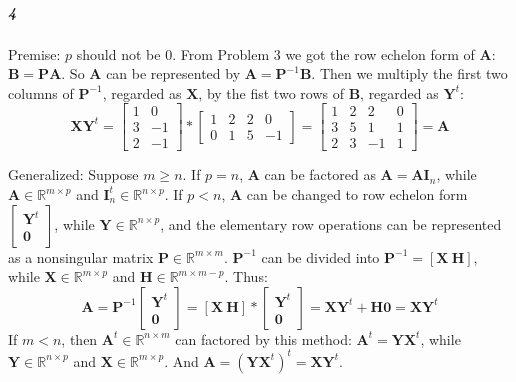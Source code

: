 \documentclass[22pt]{article}
\begin{document}
   	\subparagraph{4} Premise: $p$ should not be 0.
   	From Problem 3 we got the row echelon form of $\mathbf{A}$: $\mathbf{B} = \mathbf{PA}$. So $\mathbf{A}$ can be represented by $\mathbf{A} = \mathbf{P}^{-1}\mathbf{B}$. Then we multiply the first two columns of $\mathbf{P}^{-1}$, regarded as $\mathbf{X}$, by the fist two rows of $\mathbf{B}$, regarded as $\mathbf{Y}^t$:
   	\begin{equation}
   		\mathbf{XY}^t = \left[ \begin{array}{cc} 1 & 0\\3 &-1\\2 & -1
   		\end{array}\right] * \left[ \begin{array}{cccc} 1 & 2 &2 &0\\0 & 1 &5&-1
   		\end{array}\right] = \left[ \begin{array}{cccc} 1 & 2 &2 &0\\3 & 5 &1&1\\2&3&-1&1 
   		\end{array}\right] = \mathbf{A}
   	\end{equation}

   	Generalized: Suppose $m\geq n$. If $p = n$, $\mathbf{A}$ can be factored as $\mathbf{A} = \mathbf{AI}_n$, while $\mathbf{A} \in \mathbb{R}^{m\times p}$ and $\mathbf{I}^t_n \in \mathbb{R}^{n\times p}$. If $p < n$, $\mathbf{A}$ can be changed to row echelon form $\left[ \begin{array}{c} \mathbf{Y}^t\\ \mathbf{0}
   		\end{array} \right]$, while $ \mathbf{Y} \in \mathbb{R}^{n\times p}$, and the elementary row operations can be represented as a nonsingular matrix $\mathbf{P} \in \mathbb{R}^{m\times m}$. $\mathbf{P}^{-1}$ can be divided into $\mathbf{P}^{-1} = [\mathbf{X}\ \mathbf{H}]$, while $ \mathbf{X} \in \mathbb{R}^{m\times p}$ and $ \mathbf{H} \in\mathbb{R}^{m\times m-p}$. Thus:
   		\begin{equation}
   			\mathbf{A} = \mathbf{P}^{-1}\left[ \begin{array}{c} \mathbf{Y}^t\\ \mathbf{0}
   		\end{array} \right] = [\mathbf{X}\ \mathbf{H}]*\left[ \begin{array}{c} \mathbf{Y}^t\\ \mathbf{0}
   		\end{array} \right] = \mathbf{XY}^t + \mathbf{H0}= \mathbf{XY}^t
   		\end{equation}
   		If $m<n$, then $\mathbf{A}^t \in \mathbb{R}^{n\times m}$ can factored by this method: $\mathbf{A}^t = \mathbf{YX}^t$, while $\mathbf{Y} \in \mathbb{R}^{n\times p}$ and $\mathbf{X} \in \mathbb{R}^{m\times p}$. And $\mathbf{A} = (\mathbf{YX}^t)^t = \mathbf{XY}^t$.
\end{document}
